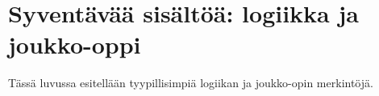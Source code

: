 \section{Syventävää sisältöä: logiikka ja joukko-oppi}

Tässä luvussa esitellään tyypillisimpiä logiikan ja joukko-opin merkintöjä.
